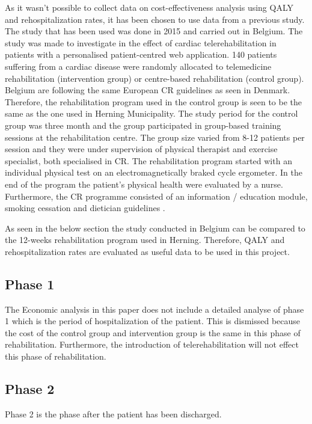 As it wasn’t possible to collect data on cost-effectiveness analysis using QALY and rehospitalization rates, it has been chosen to use data from a previous study. The study that has been used was done in 2015 and carried out in Belgium. The study was made to investigate in the effect of cardiac telerehabilitation in patients with a personalised patient-centred web application. 140 patients suffering from a cardiac disease were randomly allocated to telemedicine rehabilitation (intervention group) or centre-based rehabilitation (control group). Belgium are following the same European CR guidelines as seen in Denmark. Therefore, the rehabilitation program used in the control group is seen to be the same as the one used in Herning Municipality. The study period for the control group was three month and the group participated in group-based training sessions at the rehabilitation centre. The group size varied from 8-12 patients per session and they were under supervision of physical therapist and exercise specialist, both specialised in CR. The rehabilitation program started with an individual physical test on an electromagnetically braked cycle ergometer. In the end of the program the patient’s physical health were evaluated by a nurse. Furthermore, the CR programme consisted of an information / education module, smoking cessation and dietician guidelines \cite{costeffect}. 

As seen in the below section the study conducted in Belgium can be compared to the 12-weeks rehabilitation program used in Herning. Therefore, QALY and rehospitalization rates are evaluated as useful data to be used in this project. 



\subsection{Phase 1}

The Economic analysis in this paper does not include a detailed analyse of phase 1 which is the period of hospitalization of the patient. This is dismissed because the cost of the control group and intervention group is the same in this phase of rehabilitation. Furthermore, the introduction of telerehabilitation will not effect this phase of rehabilitation. 

\subsection{Phase 2}

Phase 2 is the phase after the patient has been discharged. 

